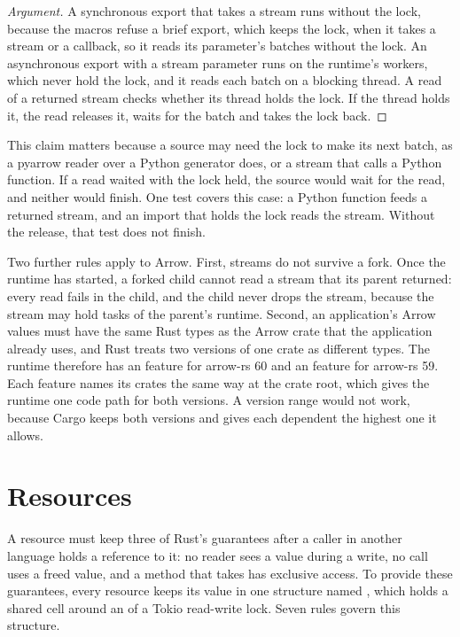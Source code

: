 \documentclass[sigconf,nonacm]{acmart}
\begin{document}
\begin{proof}[Argument]
A synchronous export that takes a stream runs without the lock, because the macros refuse a brief export, which keeps the lock, when it takes a stream or a callback, so it reads its parameter's batches without the lock. An asynchronous export with a stream parameter runs on the runtime's workers, which never hold the lock, and it reads each batch on a blocking thread. A read of a returned stream checks whether its thread holds the lock. If the thread holds it, the read releases it, waits for the batch and takes the lock back.
\end{proof}

This claim matters because a source may need the lock to make its next batch, as a pyarrow reader over a Python generator does, or a stream that calls a Python function. If a read waited with the lock held, the source would wait for the read, and neither would finish. One test covers this case: a Python function feeds a returned stream, and an import that holds the lock reads the stream. Without the release, that test does not finish.

Two further rules apply to Arrow. First, streams do not survive a fork. Once the runtime has started, a forked child cannot read a stream that its parent returned: every read fails in the child, and the child never drops the stream, because the stream may hold tasks of the parent's runtime. Second, an application's Arrow values must have the same Rust types as the Arrow crate that the application already uses, and Rust treats two versions of one crate as different types. The runtime therefore has an  feature for arrow-rs 60 and an  feature for arrow-rs 59. Each feature names its crates the same way at the crate root, which gives the runtime one code path for both versions. A version range would not work, because Cargo keeps both versions and gives each dependent the highest one it allows.

\section{Resources}
\label{sec:resources}

A resource must keep three of Rust's guarantees after a caller in another language holds a reference to it: no reader sees a value during a write, no call uses a freed value, and a method that takes  has exclusive access. To provide these guarantees, every resource keeps its value in one structure named , which holds a shared cell around an  of a Tokio read-write lock. Seven rules govern this structure.
\end{document}

